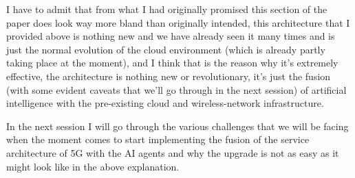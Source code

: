 \bigskip
I have to admit that from what I had originally promised this section of the paper does look way
more bland than originally intended, this architecture that I provided above is nothing new and we
have already seen it many times and is just the normal evolution of the cloud environment (which is
already partly taking place at the moment), and I think that is the reason why it's extremely
effective, the architecture is nothing new or revolutionary, it's just the fusion (with some evident
caveats that we'll go through in the next session) of artificial intelligence with the pre-existing
cloud and wireless-network infrastructure.

In the next session I will go through the various challenges that we will be facing when the moment
comes to start implementing the fusion of the service architecture of 5G with the AI agents and why
the upgrade is not as easy as it might look like in the above explanation.
